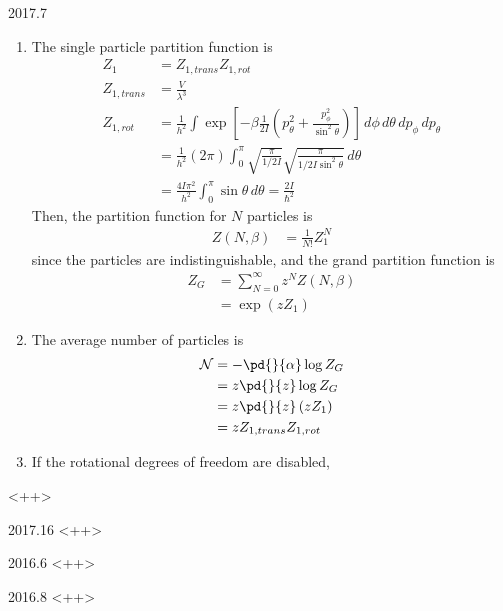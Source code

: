 \documentclass[12pt]{article}
\begin{document}
\begin{solution}{2017.7}
\begin{enumerate}
\item
The single particle partition function is
\begin{align*}
Z_1 & = Z_{1, trans} Z_{1, rot} \\
Z_{1, trans} & = \frac{V}{\lambda^3} \\
Z_{1, rot} & = \frac{1}{h^2} \int \exp \left[ -\beta \frac{1}{2I} \left( p_\theta^2 + \frac{p_\phi^2}{\sin^2 \theta} \right) \right] \, d\phi \, d\theta \, dp_\phi \, dp_\theta \\
& = \frac{1}{h^2} (2\pi) \int_0^\pi \sqrt{\frac{\pi}{1/2I}} \sqrt{\frac{\pi}{1/2I \sin^2 \theta}} \, d\theta \\
& = \frac{4I \pi^2}{h^2} \int_0^\pi \sin \theta \, d\theta = \frac{2I}{\hbar^2} 
\end{align*}
Then, the partition function for $N$ particles is
\begin{align*}
Z(N, \beta) & = \frac{1}{N!} Z_1^N
\end{align*}
since the particles are indistinguishable, and the grand partition function is
\begin{align*}
Z_G & = \sum_{N=0}^\infty z^N Z(N, \beta) \\
& = \exp \left( z Z_1 \right)
\end{align*}

\item
The average number of particles is
\begin{align*}
\mathcal{N} & = -\pd{}{\alpha} \log Z_G \\
& = z \pd{}{z} \log Z_G \\
& = z \pd{}{z} \left( z Z_1 \right) \\
& = z Z_{1, trans} Z_{1, rot}
\end{align*}

\item
If the rotational degrees of freedom are disabled, 

\end{enumerate}
<++>
\end{solution}


\begin{solution}{2017.16}
<++>
\end{solution}


\begin{solution}{2016.6}
<++>
\end{solution}


\begin{solution}{2016.8}
<++>
\end{solution}
\end{document}
